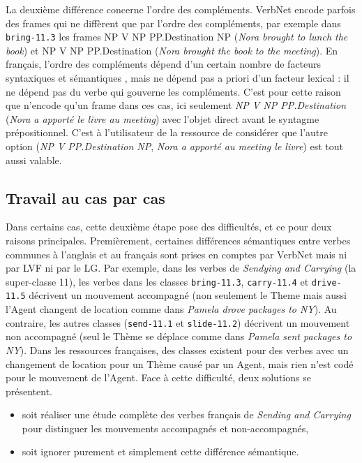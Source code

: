 La deuxième différence concerne l'ordre des compléments. VerbNet encode parfois
des frames qui ne diffèrent que par l'ordre des compléments, par exemple dans
{\color{blue}\texttt{bring-11.3}} les frames NP V NP PP.Destination NP
(\emph{Nora brought to lunch the book}) et NP V NP PP.Destination (\emph{Nora
brought the book to the meeting}). En français, l'ordre des compléments dépend
d'un certain nombre de facteurs syntaxiques et sémantiques
\citep{thuilier2012contraintes}, mais ne dépend pas a priori d'un facteur
lexical : il ne dépend pas du verbe qui gouverne les compléments. C'est pour
cette raison que \verbenet{} n'encode qu'un frame dans ces cas, ici seulement
\emph{NP V NP PP.Destination} (\emph{Nora a apporté le livre au meeting}) avec
l'objet direct avant le syntagme prépositionnel. C'est à l'utilisateur de la
ressource de considérer que l'autre option (\emph{NP V PP.Destination NP},
\emph{Nora a apporté au meeting le livre}) est tout aussi valable.

\subsection{Travail au cas par cas}\label{casebycase}

Dans certains cas, cette deuxième étape pose des difficultés, et ce pour deux
raisons principales. Premièrement, certaines différences sémantiques entre
verbes communes à l'anglais et au français sont prises en comptes par VerbNet
mais ni par LVF ni par le LG. Par exemple, dans les verbes de \emph{Sendying
and Carrying} (la super-classe 11), les verbes dans les classes
{\color{blue}\texttt{bring-11.3}}, {\color{blue}\texttt{carry-11.4}} et
{\color{blue}\texttt{drive-11.5}}
décrivent un mouvement accompagné (non seulement le Theme mais aussi l'Agent
changent de location comme dans \emph{Pamela drove packages to NY}). Au
contraire, les autres classes ({\color{blue}\texttt{send-11.1}} et
{\color{blue}\texttt{slide-11.2}}) décrivent un mouvement non accompagné (seul le Thème
se déplace comme dans \emph{Pamela sent packages to NY}). Dans les ressources
françaises, des classes existent pour des verbes avec un changement de location
pour un Thème causé par un Agent, mais rien n'est codé pour le mouvement de
l'Agent. Face à cette difficulté, deux solutions se présentent.

\begin{itemize}
    \item soit réaliser une étude complète des verbes français de \emph{Sending
        and Carrying} pour distinguer les mouvements accompagnés et
        non-accompagnés,
    \item soit ignorer purement et simplement cette différence sémantique.
\end{itemize}

